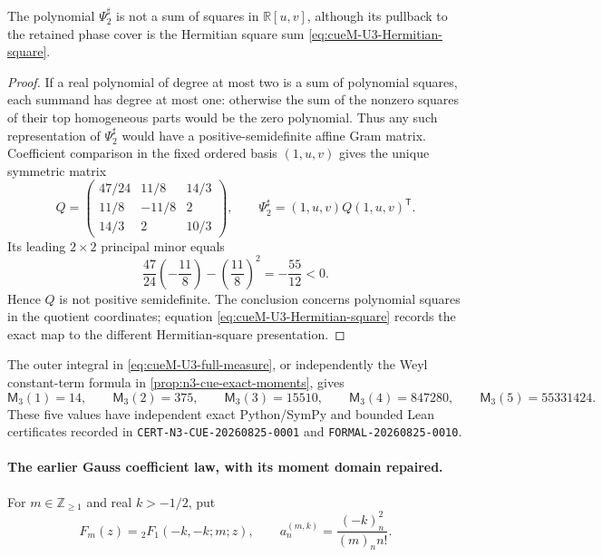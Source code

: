 \begin{proposition}
\label{prop:cueM-Psi2-not-SOS}
The polynomial $\Psi_2^\sharp$ is not a sum of squares in $\mathbb R[u,v]$, although its
pullback to the retained phase cover is the Hermitian square sum
\eqref{eq:cueM-U3-Hermitian-square}.
\end{proposition}

\begin{proof}
If a real polynomial of degree at most two is a sum of polynomial squares, each summand has
degree at most one: otherwise the sum of the nonzero squares of their top homogeneous parts
would be the zero polynomial.  Thus any such representation of $\Psi_2^\sharp$ would have a
positive-semidefinite affine Gram matrix.  Coefficient comparison in the fixed ordered basis
$(1,u,v)$ gives the unique symmetric matrix
\[
 Q=\begin{pmatrix}
 47/24&11/8&14/3\\
 11/8&-11/8&2\\
 14/3&2&10/3
 \end{pmatrix},
 \qquad
 \Psi_2^\sharp=(1,u,v)Q(1,u,v)^{\mathsf T}.
\]
Its leading $2\times2$ principal minor equals
\[
 \frac{47}{24}\left(-\frac{11}{8}\right)-\left(\frac{11}{8}\right)^2
 =-\frac{55}{12}<0.
\]
Hence $Q$ is not positive semidefinite.  The conclusion concerns polynomial squares in the
quotient coordinates; equation \eqref{eq:cueM-U3-Hermitian-square} records the exact map to
the different Hermitian-square presentation.
\end{proof}

The outer integral in \eqref{eq:cueM-U3-full-measure}, or independently the Weyl
constant-term formula in \cref{prop:n3-cue-exact-moments}, gives
\begin{equation}
 \mathsf M_3(1)=14,\qquad \mathsf M_3(2)=375,\qquad
 \mathsf M_3(3)=15510,\qquad \mathsf M_3(4)=847280,\qquad
 \mathsf M_3(5)=55331424.
 \label{eq:cueM-U3-finite-moments}
\end{equation}
These five values have independent exact Python/SymPy and bounded Lean certificates recorded
in \texttt{CERT-N3-CUE-20260825-0001} and \texttt{FORMAL-20260825-0010}.

\paragraph{The earlier Gauss coefficient law, with its moment domain repaired.}
For $m\in\mathbb Z_{\geq1}$ and real $k>-1/2$, put
\begin{equation}
 F_m(z)={}_2F_1(-k,-k;m;z),\qquad
 a_n^{(m,k)}=\frac{(-k)_n^2}{(m)_n n!}.
 \label{eq:cueM-Gauss-F}
\end{equation}

